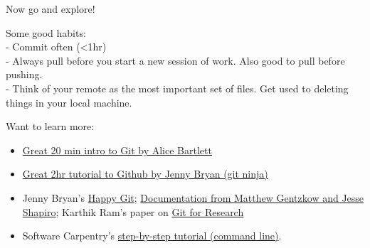 \documentclass[ignorenonframetext,]{beamer}
\begin{document}
\begin{frame}{Now go and explore!}
\protect\hypertarget{now-go-and-explore}{}

Some good habits:\\
- Commit often (\textless{}1hr)\\
- Always pull before you start a new session of work. Also good to pull
before pushing.\\
- Think of your remote as the most important set of files. Get used to
deleting things in your local machine.

\end{frame}

\begin{frame}{Want to learn more:}
\protect\hypertarget{want-to-learn-more}{}

\begin{itemize}
\item
  \href{https://www.youtube.com/watch?v=eWxxfttcMts}{Great 20 min intro
  to Git by Alice Bartlett}
\item
  \href{https://www.rstudio.com/resources/videos/happy-git-and-gihub-for-the-user-tutorial/}{Great
  2hr tutorial to Github by Jenny Bryan (git ninja)}
\item
  Jenny Bryan's \href{http://happygitwithr.com/}{Happy Git};
  \href{http://web.stanford.edu/~gentzkow/research/CodeAndData.pdf}{Documentation
  from Matthew Gentzkow and Jesse Shapiro}; Karthik Ram's paper on
  \href{https://scfbm.biomedcentral.com/articles/10.1186/1751-0473-8-7}{Git
  for Research}
\item
  Software Carpentry's
  \href{https://swcarpentry.github.io/git-novice/}{step-by-step tutorial
  (command line)}.
\end{itemize}

\end{frame}
\end{document}
